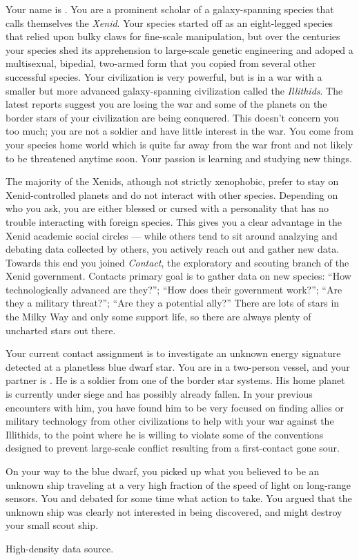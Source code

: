 \documentclass[char]{guildcamp1}
\begin{document}
\name{\cPassive{}}

Your name is \cPassive{\they}. You are a prominent scholar of a galaxy-spanning species that calls themselves the \emph{Xenid}. Your species started off as an eight-legged species that relied upon bulky claws for fine-scale manipulation, but over the centuries your species shed its apprehension to large-scale genetic engineering and adoped a multisexual, bipedial, two-armed form that you copied from several other successful species. Your civilization is very powerful, but is in a war with a smaller but more advanced galaxy-spanning civilization called the \emph{Illithids}. The latest reports suggest you are losing the war and some of the planets on the border stars of your civilization are being conquered. This doesn't concern you too much; you are not a soldier and have little interest in the war. You come from your species home world which is quite far away from the war front and not likely to be threatened anytime soon. Your passion is learning and studying new things.

The majority of the Xenids, athough not strictly xenophobic, prefer to stay on Xenid-controlled planets and do not interact with other species. Depending on who you ask, you are either blessed or cursed with a personality that has no trouble interacting with foreign species. This gives you a clear advantage in the Xenid academic social circles --- while others tend to sit around analzying and debating data collected by others, you actively reach out and gather new data. Towards this end you joined \emph{Contact}, the exploratory and scouting branch of the Xenid government. Contacts primary goal is to gather data on new species: ``How technologically advanced are they?''; ``How does their government work?''; ``Are they a military threat?''; ``Are they a potential ally?'' There are lots of stars in the Milky Way and only some support life, so there are always plenty of uncharted stars out there.

Your current contact assignment is to investigate an unknown energy signature detected at a planetless blue dwarf star. You are in a two-person vessel, and your partner is \cAlien{\they}. He is a soldier from one of the border star systems. His home planet is currently under siege and has possibly already fallen. In your previous encounters with him, you have found him to be very focused on finding allies or military technology from other civilizations to help with your war against the Illithids, to the point where he is willing to violate some of the conventions designed to prevent large-scale conflict resulting from a first-contact gone sour.

On your way to the blue dwarf, you picked up what you believed to be an unknown ship traveling at a very high fraction of the speed of light on long-range sensors. You and \cAlien{\they} debated for some time what action to take. You argued that the unknown ship was clearly not interested in being discovered, and might destroy your small scout ship.

High-density data source.

\begin{contacts}
  \contact{\cActive{}} 
\end{contacts}
\end{document}
